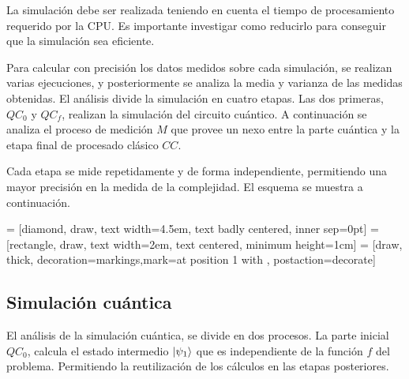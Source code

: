 La simulación debe ser realizada teniendo en cuenta el tiempo de procesamiento 
requerido por la CPU. Es importante investigar como reducirlo para conseguir que 
la simulación sea eficiente.

Para calcular con precisión los datos medidos sobre cada simulación, se realizan 
varias ejecuciones, y posteriormente se analiza la media y varianza de las 
medidas obtenidas. El análisis divide la simulación en cuatro etapas. Las dos 
primeras, $QC_0$ y $QC_f$, realizan la simulación del circuito cuántico. A 
continuación se analiza el proceso de medición $M$ que provee un nexo entre la 
parte cuántica y la etapa final de procesado clásico $CC$.

Cada etapa se mide repetidamente y de forma independiente, permitiendo una mayor 
precisión en la medida de la complejidad. El esquema se muestra a continuación.
%
\begin{center}
 = [diamond, draw, text width=4.5em, text badly centered, 
inner sep=0pt]
 = [rectangle, draw, text width=2em, text centered, minimum 
height=1cm]
 = [draw, thick, decoration={markings,mark=at position 
1 with {}}, postaction={decorate}]
%
\end{center}
%

\subsection{Simulación cuántica}
El análisis de la simulación cuántica, se divide en dos procesos. La parte 
inicial $QC_0$, calcula el estado intermedio $\ket{\psi_{1}}$ que es independiente de 
la función $f$ del problema. Permitiendo la reutilización de los cálculos en las 
etapas posteriores.

